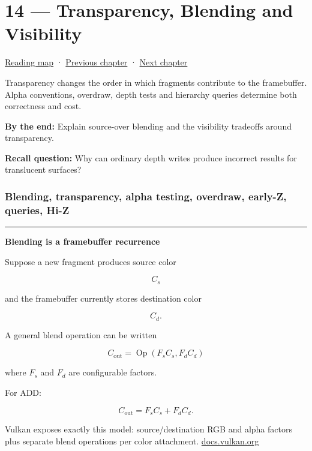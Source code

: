 \hypertarget{03-visual-computing-i-ch014}{}
\chapter{14 --- Transparency, Blending and Visibility}\label{03-visual-computing-i-ch014-transparency-blending-and-visibility}

\hyperref[volume-reading-map]{Reading map} · \hyperref[03-visual-computing-i-ch013-from-view-space-to-clip-space]{Previous chapter} · \hyperref[03-visual-computing-i-ch015-rasterization-foundations-and-renderer-evidence]{Next chapter}

Transparency changes the order in which fragments contribute to the framebuffer. Alpha conventions, overdraw, depth tests and hierarchy queries determine both correctness and cost.

\textbf{By the end:} Explain source-over blending and the visibility tradeoffs around transparency.

\textbf{Recall question:} Why can ordinary depth writes produce incorrect results for translucent surfaces?

\subsection{Blending, transparency, alpha testing, overdraw, early-Z, queries, Hi-Z}\label{03-visual-computing-i-ch014-blending-transparency-alpha-testing-overdraw-early-z-queries-hi-z}

\begin{center}\rule{0.5\linewidth}{0.5pt}\end{center}

\textbf{Blending is a framebuffer recurrence}

Suppose a new fragment produces source color

\[
C_s
\]

and the framebuffer currently stores destination color

\[
C_d.
\]

A general blend operation can be written

\[
\boxed{
C_{\text{out}}
=
\operatorname{Op}
\left(
F_s C_s,
F_d C_d
\right)
}
\]

where \(F_s\) and \(F_d\) are configurable factors.

For ADD:

\[
C_{\text{out}}
=
F_sC_s+F_dC_d.
\]

Vulkan exposes exactly this model: source/destination RGB and alpha factors plus separate blend operations per color attachment. \href{https://docs.vulkan.org/spec/latest/chapters/framebuffer.html?utm_source=chatgpt.com}{docs.vulkan.org}

